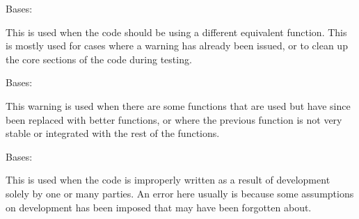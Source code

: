 \documentclass[letterpaper,10pt,english]{sphinxmanual}
\begin{document}

\begin{fulllineitems}
\label{\detokenize{docstrings/ifa_smeargle.core.error:ifa_smeargle.core.error.DeprecatedError}}
Bases: {\hyperref[\detokenize{docstrings/ifa_smeargle.core.error:ifa_smeargle.core.error.Ifas_BaseException}]{}}

This is used when the code should be using a different
equivalent function. This is mostly used for cases where a
warning has already been issued, or to clean up the core
sections of the code during testing.

\end{fulllineitems}


\begin{fulllineitems}
\label{\detokenize{docstrings/ifa_smeargle.core.error:ifa_smeargle.core.error.DeprecatedWarning}}
Bases: {\hyperref[\detokenize{docstrings/ifa_smeargle.core.error:ifa_smeargle.core.error.Ifas_Warning}]{}}

This warning is used when there are some functions that are
used but have since been replaced with better functions, or
where the previous function is not very stable or integrated
with the rest of the functions.

\end{fulllineitems}


\begin{fulllineitems}
\label{\detokenize{docstrings/ifa_smeargle.core.error:ifa_smeargle.core.error.DevelopmentError}}
Bases: {\hyperref[\detokenize{docstrings/ifa_smeargle.core.error:ifa_smeargle.core.error.Ifas_BaseException}]{}}

This is used when the code is improperly written as a result of
development solely by one or many parties. An error here usually
is because some assumptions on development has been imposed that
may have been forgotten about.

\end{fulllineitems}
\end{document}
